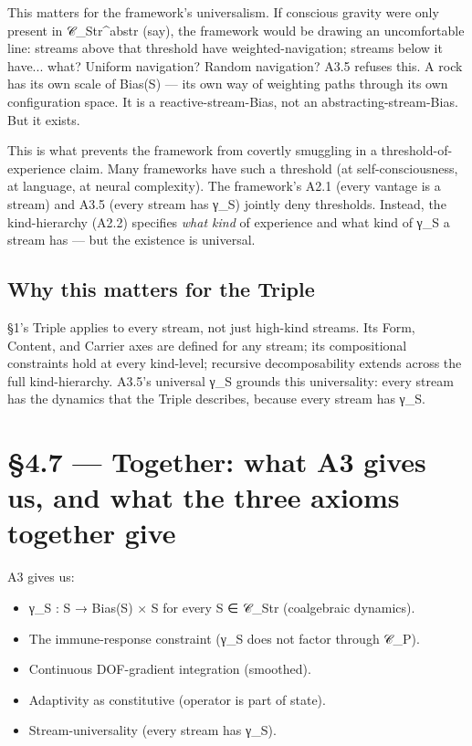 \documentclass[11pt, openany]{book}
\newcommand{\sectionbreak}{\clearpage}
\begin{document}
This matters for the framework's universalism. If conscious gravity were only present in 𝒞\_\allowbreak{}Str\textasciicircum{}abstr (say), the framework would be drawing an uncomfortable line: streams above that threshold have weighted-navigation; streams below it have... what? Uniform navigation? Random navigation? A3.5 refuses this. A rock has its own scale of Bias(S) --- its own way of weighting paths through its own configuration space. It is a reactive-stream-Bias, not an abstracting-stream-Bias. But it exists.

This is what prevents the framework from covertly smuggling in a threshold-of-experience claim. Many frameworks have such a threshold (at self-consciousness, at language, at neural complexity). The framework's A2.1 (every vantage is a stream) and A3.5 (every stream has γ\_\allowbreak{}S) jointly deny thresholds. Instead, the kind-hierarchy (A2.2) specifies \textit{what kind} of experience and what kind of γ\_\allowbreak{}S a stream has --- but the existence is universal.

\subsection{Why this matters for the Triple}

§1's Triple applies to every stream, not just high-kind streams. Its Form, Content, and Carrier axes are defined for any stream; its compositional constraints hold at every kind-level; recursive decomposability extends across the full kind-hierarchy. A3.5's universal γ\_\allowbreak{}S grounds this universality: every stream has the dynamics that the Triple describes, because every stream has γ\_\allowbreak{}S.

\sectionbreak

\section{§4.7 --- Together: what A3 gives us, and what the three axioms together give}

A3 gives us:
\begin{itemize}
\item γ\_\allowbreak{}S : S → Bias(S) × S for every S ∈ 𝒞\_\allowbreak{}Str (coalgebraic dynamics).
\item The immune-response constraint (γ\_\allowbreak{}S does not factor through 𝒞\_\allowbreak{}P).
\item Continuous DOF-gradient integration (smoothed).
\item Adaptivity as constitutive (operator is part of state).
\item Stream-universality (every stream has γ\_\allowbreak{}S).
\end{itemize}
\end{document}
